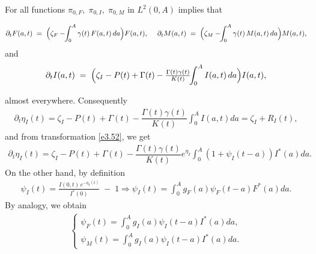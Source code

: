 \documentclass[10pt, a4paper]{amsart}
\makeatletter
\theoremstyle{plain}
\theoremstyle{definition}
\theoremstyle{remark}
\renewenvironment{proof}[1][\proofname]{\par
  \pushQED{\qed}%
  \normalfont \topsep6\p@\@plus6\p@\relax
  \trivlist
  \item[\hskip\labelsep
        \itshape
    #1\ \ref{#1}.]\ignorespaces
}{%
  \popQED\endtrivlist\@endpefalse
}
\numberwithin{equation}{section}
\makeatother
\begin{document}
\begin{proof}[of Lemma \ref{le3.4}]
For all  functions $\pi_{0,F},\;\pi_{0,I},\; \pi_{0,M}$ in $L^2(0,A)$ implies that

\begin{align}\label{e3.64}
    \partial_t F(a,t)\;=\;\Bigl(\zeta_F-\!\!\int_{0}^{A}\gamma(t)\,F(a,t)\,da\Bigr)F(a,t),\;\quad
\partial_t M(a,t)\;=\;\Bigl(\zeta_M-\!\!\int_{0}^{A}\gamma(t)\,M(a,t)\,da\Bigr)M(a,t),
\end{align}
and 
\begin{align}\label{e3.65}
\partial_t I(a,t)\;=\;\Bigl(\zeta_I - P(t) + \Gamma(t) - \tfrac{\Gamma(t)\gamma(t)}{K(t)}\!\!\int_{0}^{A}I(a,t)\,da\Bigr)I(a,t),
\end{align}

almost everywhere. Consequently
\begin{align*}
    \partial_t\eta_I(t)=\zeta_I-P(t)+\Gamma(t)-\dfrac{\Gamma(t)\gamma(t)}{K(t)}\displaystyle\int_{0}^AI(a,t)da=\zeta_I+R_I(t),
\end{align*}
and from transformation \eqref{e3.52}, we get 
\begin{align}\label{e3.66}
\partial_t\eta_I(t)=\zeta_I-P(t)+\Gamma(t)-\dfrac{\Gamma(t)\gamma(t)}{K(t)}e^{\eta_I}\displaystyle\int_{0}^A (1+\psi_I(t-a))I^*(a)da.
\end{align}
On the other hand, by definition
\begin{align}\label{e3.67}
    \psi_I(t)
 = \frac{I(0,t)\,e^{-\eta_I(t)}}{I^*(0)} \;-\; 1\Longrightarrow\psi_I(t)=\displaystyle\int_0^Ag_F(a)\psi_F(t-a)F^*(a)da.
\end{align}
By analogy, we obtain
\begin{align}\label{e3.68}
\begin{cases}
\psi_F(t)=\displaystyle\int_0^Ag_I(a)\psi_I(t-a)I^*(a)da,\\
\psi_M(t)= \displaystyle\int_0^Ag_I(a)\psi_I(t-a)I^*(a)da.
\end{cases}
\end{align}


\end{proof}
\end{document}
